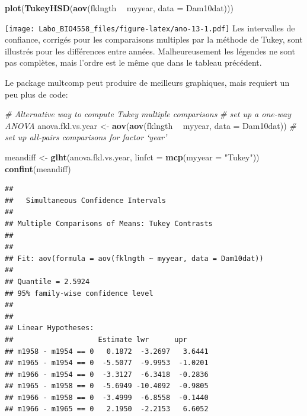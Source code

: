 \documentclass[12pt,]{book}
\newenvironment{Shaded}{\begin{snugshade}}{\end{snugshade}}
\newcommand{\CommentTok}[1]{\textcolor[rgb]{0.37,0.37,0.37}{\textit{#1}}}
\newcommand{\DataTypeTok}[1]{\textcolor[rgb]{0.27,0.27,0.27}{#1}}
\newcommand{\KeywordTok}[1]{\textcolor[rgb]{0.27,0.27,0.27}{\textbf{#1}}}
\newcommand{\NormalTok}[1]{#1}
\newcommand{\OperatorTok}[1]{\textcolor[rgb]{0.43,0.43,0.43}{\textbf{#1}}}
\newcommand{\StringTok}[1]{\textcolor[rgb]{0.5,0.5,0.5}{#1}}
\begin{document}
\begin{Shaded}
\begin{Highlighting}[]
\KeywordTok{plot}\NormalTok{(}\KeywordTok{TukeyHSD}\NormalTok{(}\KeywordTok{aov}\NormalTok{(fklngth }\OperatorTok{~}\StringTok{ }\NormalTok{myyear, }\DataTypeTok{data =}\NormalTok{ Dam10dat)))}
\end{Highlighting}
\end{Shaded}

\texttt{[image: Labo\_BIO4558\_files/figure-latex/ano-13-1.pdf]}
Les intervalles de confiance, corrigés pour les comparaisons multiples par la méthode de Tukey, sont illustrés pour les différences entre années. Malheureusement les légendes ne sont pas complètes, mais l'ordre est le même que dans le tableau précédent.

Le package multcomp peut produire de meilleurs graphiques, mais requiert un peu plus de code:

\begin{Shaded}
\begin{Highlighting}[]
\CommentTok{# Alternative way to compute Tukey multiple comparisons}
\CommentTok{# set up a one-way ANOVA}
\NormalTok{anova.fkl.vs.year <-}\StringTok{ }\KeywordTok{aov}\NormalTok{(}\KeywordTok{aov}\NormalTok{(fklngth }\OperatorTok{~}\StringTok{ }\NormalTok{myyear, }\DataTypeTok{data =}\NormalTok{ Dam10dat))}
\CommentTok{# set up all-pairs comparisons for factor `year'}

\NormalTok{meandiff <-}\StringTok{ }\KeywordTok{glht}\NormalTok{(anova.fkl.vs.year, }\DataTypeTok{linfct =} \KeywordTok{mcp}\NormalTok{(}\DataTypeTok{myyear =}
\StringTok{"Tukey"}\NormalTok{))}
\KeywordTok{confint}\NormalTok{(meandiff)}
\end{Highlighting}
\end{Shaded}

\begin{verbatim}
## 
## 	 Simultaneous Confidence Intervals
## 
## Multiple Comparisons of Means: Tukey Contrasts
## 
## 
## Fit: aov(formula = aov(fklngth ~ myyear, data = Dam10dat))
## 
## Quantile = 2.5924
## 95% family-wise confidence level
##  
## 
## Linear Hypotheses:
##                    Estimate lwr      upr     
## m1958 - m1954 == 0   0.1872  -3.2697   3.6441
## m1965 - m1954 == 0  -5.5077  -9.9953  -1.0201
## m1966 - m1954 == 0  -3.3127  -6.3418  -0.2836
## m1965 - m1958 == 0  -5.6949 -10.4092  -0.9805
## m1966 - m1958 == 0  -3.4999  -6.8558  -0.1440
## m1966 - m1965 == 0   2.1950  -2.2153   6.6052
\end{verbatim}
\end{document}
